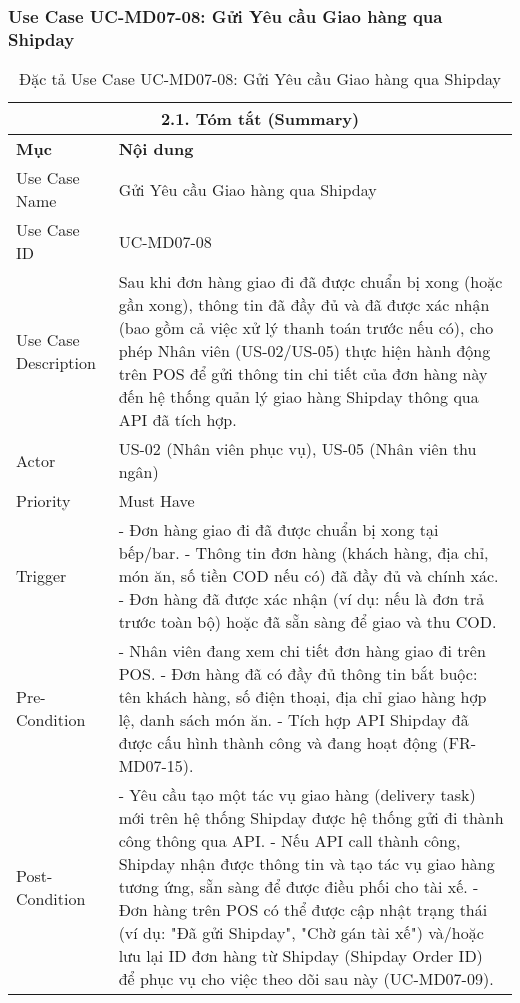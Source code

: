 \subsubsection{Use Case UC-MD07-08: Gửi Yêu cầu Giao hàng qua Shipday}
\begin{longtable}{|m{4cm}|p{11cm}|}
\caption{Đặc tả Use Case UC-MD07-08: Gửi Yêu cầu Giao hàng qua Shipday} \label{tab:uc_md07_08_final_full} \\
\hline
\multicolumn{2}{|c|}{\textbf{2.1. Tóm tắt (Summary)}} \\
\hline
\textbf{Mục} & \textbf{Nội dung} \\
\hline
\endhead %
\hline
\endfoot %
\hline
\endlastfoot %
Use Case Name & Gửi Yêu cầu Giao hàng qua Shipday \\
\hline
Use Case ID & UC-MD07-08 \\
\hline
Use Case Description & Sau khi đơn hàng giao đi đã được chuẩn bị xong (hoặc gần xong), thông tin đã đầy đủ và đã được xác nhận (bao gồm cả việc xử lý thanh toán trước nếu có), cho phép Nhân viên (US-02/US-05) thực hiện hành động trên POS để gửi thông tin chi tiết của đơn hàng này đến hệ thống quản lý giao hàng Shipday thông qua API đã tích hợp. \\
\hline
Actor & US-02 (Nhân viên phục vụ), US-05 (Nhân viên thu ngân) \\
\hline
Priority & Must Have \\
\hline
Trigger & - Đơn hàng giao đi đã được chuẩn bị xong tại bếp/bar. \newline - Thông tin đơn hàng (khách hàng, địa chỉ, món ăn, số tiền COD nếu có) đã đầy đủ và chính xác. \newline - Đơn hàng đã được xác nhận (ví dụ: nếu là đơn trả trước toàn bộ) hoặc đã sẵn sàng để giao và thu COD. \\
\hline
Pre-Condition & - Nhân viên đang xem chi tiết đơn hàng giao đi trên POS. \newline - Đơn hàng đã có đầy đủ thông tin bắt buộc: tên khách hàng, số điện thoại, địa chỉ giao hàng hợp lệ, danh sách món ăn. \newline - Tích hợp API Shipday đã được cấu hình thành công và đang hoạt động (FR-MD07-15). \\
\hline
Post-Condition & - Yêu cầu tạo một tác vụ giao hàng (delivery task) mới trên hệ thống Shipday được hệ thống gửi đi thành công thông qua API. \newline - Nếu API call thành công, Shipday nhận được thông tin và tạo tác vụ giao hàng tương ứng, sẵn sàng để được điều phối cho tài xế. \newline - Đơn hàng trên POS có thể được cập nhật trạng thái (ví dụ: "Đã gửi Shipday", "Chờ gán tài xế") và/hoặc lưu lại ID đơn hàng từ Shipday (Shipday Order ID) để phục vụ cho việc theo dõi sau này (UC-MD07-09). \\

\end{longtable}
